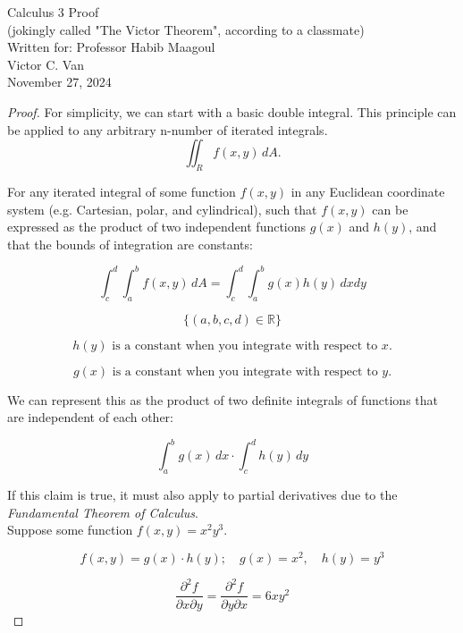 \documentclass{article}
\begin{document}
\begin{titlepage}
    \centering
    \vspace*{\fill} %
    {\Large Calculus 3 Proof} \\[0.5cm]
    {\Large (jokingly called "The Victor Theorem", according to a classmate)} \\[0.5cm]
    {\Large Written for: Professor Habib Maagoul} \\[0.5cm]
    {\large Victor C. Van} \\[1cm]
    {\large November 27, 2024}
    \vspace*{\fill} %
\end{titlepage}

\begin{proof}

For simplicity, we can start with a basic double integral. This principle can be applied to any arbitrary n-number of iterated integrals.
\[
    \iint_Rf(x,y) \, dA.
\]

For any iterated integral of some function $f(x,y)$ in any Euclidean coordinate system (e.g. Cartesian, polar, and cylindrical), such that $f(x,y)$ can be expressed as the product of two independent functions $g(x)$ and $h(y)$, and that the bounds of integration are constants:

\[
    \int_{c}^{d} \int_{a}^{b} f(x, y) \, dA = \int_{c}^{d} \int_{a}^{b} g(x)h(y) \,dxdy
\]

\[
    \{(a, b, c, d) \in \mathbb{R}\}
\]

\[
    h(y) \text{ is a constant when you integrate with respect to } x.
\]

\[
    g(x) \text{ is a constant when you integrate with respect to } y.
\]

We can represent this as the product of two definite integrals of functions that are independent of each other:

\[
\int_{a}^{b}g(x) \,dx \cdot \int_{c}^{d}h(y) \,dy
\]

If this claim is true, it must also apply to partial derivatives due to the \textit{Fundamental Theorem of Calculus}.\\

Suppose some function $f(x, y) = x^2 y^3$.

\[
    f(x, y) = g(x) \cdot h(y); \quad g(x) = x^2, \quad h(y) = y^3
\]

\[
    \frac{\partial^{2} f}{\partial x \partial y} = \frac{\partial^{2}f}{\partial y \partial x} = 6xy^{2}
\]


\end{proof}
\end{document}
